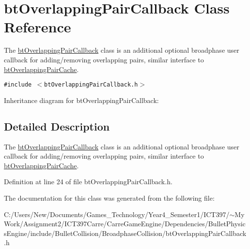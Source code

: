 \hypertarget{classbt_overlapping_pair_callback}{
\section{btOverlappingPairCallback Class Reference}
\label{classbt_overlapping_pair_callback}
}
The \hyperlink{classbt_overlapping_pair_callback}{btOverlappingPairCallback} class is an additional optional broadphase user callback for adding/removing overlapping pairs, similar interface to \hyperlink{classbt_overlapping_pair_cache}{btOverlappingPairCache}.  


{\tt \#include $<$btOverlappingPairCallback.h$>$}

Inheritance diagram for btOverlappingPairCallback:

\subsection{Detailed Description}
The \hyperlink{classbt_overlapping_pair_callback}{btOverlappingPairCallback} class is an additional optional broadphase user callback for adding/removing overlapping pairs, similar interface to \hyperlink{classbt_overlapping_pair_cache}{btOverlappingPairCache}. 

Definition at line 24 of file btOverlappingPairCallback.h.

The documentation for this class was generated from the following file:\begin{CompactItemize}
\item 
C:/Users/New/Documents/Games\_\-Technology/Year4\_\-Semester1/ICT397/$\sim$My Work/Assignment2/ICT397Carre/CarreGameEngine/Dependencies/BulletPhysicsEngine/include/BulletCollision/BroadphaseCollision/btOverlappingPairCallback.h\end{CompactItemize}
